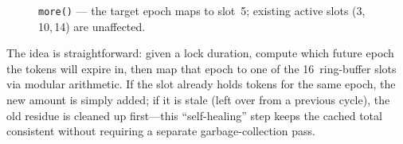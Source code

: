 \documentclass[10pt,a4paper,twocolumn]{article}
\begin{document}
\begin{figure}[htbp]
\centering
{}
\caption{\texttt{more()} --- the target epoch maps to slot~5; existing active slots (3,\,10,\,14) are unaffected.}
\label{fig:more}
\end{figure}

The idea is straightforward: given a lock duration, compute which future epoch the tokens will expire in, then map that epoch to one of the 16~ring-buffer slots via modular arithmetic.  If the slot already holds tokens for the same epoch, the new amount is simply added; if it is stale (left over from a previous cycle), the old residue is cleaned up first---this ``self-healing'' step keeps the cached total consistent without requiring a separate garbage-collection pass.
\end{document}
